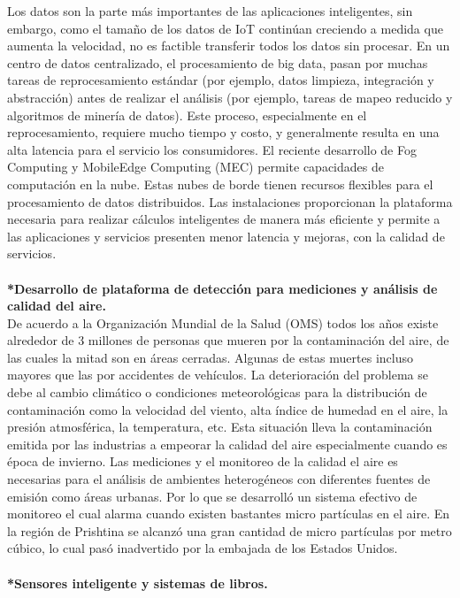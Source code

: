 \documentclass[10pt,a4paper]{article}
\begin{document}
\begin{multicols}{2}
Los datos son la parte más importantes de las aplicaciones inteligentes, sin embargo, como el tamaño de los datos de IoT continúan creciendo a medida que aumenta la velocidad, no es factible transferir todos los datos sin procesar.
En un centro de datos centralizado, el procesamiento de big data, pasan por muchas tareas de reprocesamiento estándar (por ejemplo, datos limpieza, integración y abstracción) antes de realizar el análisis (por ejemplo, tareas de mapeo reducido y algoritmos de minería de datos).
Este proceso, especialmente en el reprocesamiento, requiere mucho tiempo y costo, y generalmente resulta en una alta latencia para el servicio los consumidores.
El reciente desarrollo de Fog Computing y MobileEdge Computing (MEC) permite capacidades de computación en la nube. Estas nubes de borde tienen recursos flexibles para el procesamiento de datos distribuidos. Las instalaciones proporcionan la plataforma necesaria para realizar cálculos inteligentes de manera más eficiente y permite a las aplicaciones y servicios presenten menor latencia y mejoras, con la calidad de servicios.\\
\\
\textbf{*Desarrollo de plataforma de detección para mediciones y análisis de calidad del aire.}\\
De acuerdo a la Organización Mundial de la Salud (OMS) todos los años existe alrededor de 3 millones de personas que mueren por la contaminación del aire, de las cuales la mitad son en áreas cerradas. Algunas de estas muertes incluso mayores que las por accidentes de vehículos. La deterioración del problema se debe al cambio climático o condiciones meteorológicas para la distribución de contaminación como la velocidad del viento, alta índice de humedad en el aire, la presión atmosférica, la temperatura, etc. Esta situación lleva la contaminación emitida por las industrias a empeorar la calidad del aire especialmente cuando es época de invierno. Las mediciones y el monitoreo de la calidad el aire es necesarias para el análisis de ambientes heterogéneos con diferentes fuentes de emisión como áreas urbanas. Por lo que se desarrolló un sistema efectivo de monitoreo el cual alarma cuando existen bastantes micro partículas en el aire. En la región de Prishtina se alcanzó una gran cantidad de micro partículas por metro cúbico, lo cual pasó inadvertido por la embajada de los Estados Unidos.\\
\\
\textbf{*Sensores inteligente y sistemas de libros.}\\

\end{multicols}
\end{document}
